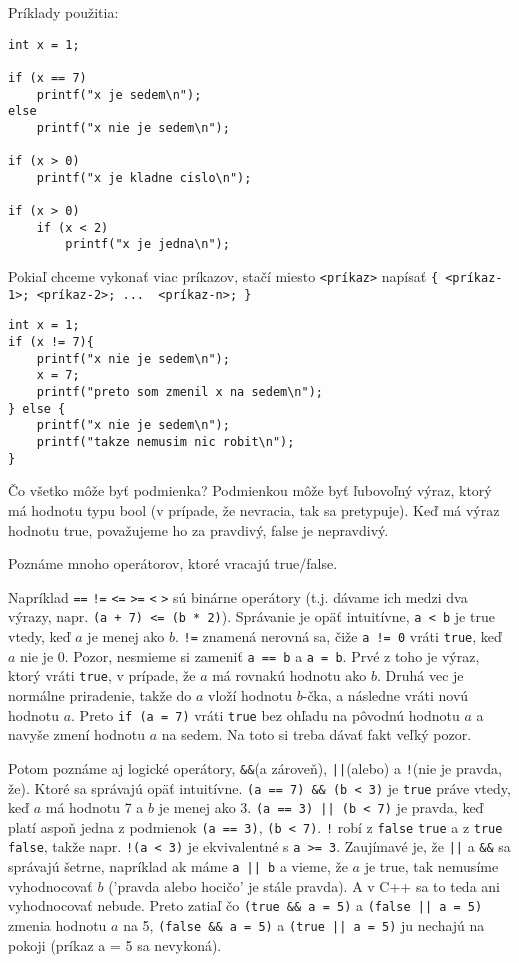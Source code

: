 Príklady použitia:
\begin{lstlisting}
int x = 1;

if (x == 7) 
    printf("x je sedem\n");
else
    printf("x nie je sedem\n");

if (x > 0)
    printf("x je kladne cislo\n");

if (x > 0)
    if (x < 2)
        printf("x je jedna\n");
\end{lstlisting}

Pokiaľ chceme vykonať viac príkazov, stačí miesto \verb!<príkaz>! napísať \verb!{ <príkaz-1>; <príkaz-2>; ...  <príkaz-n>; }!
\begin{lstlisting}
int x = 1;
if (x != 7){
    printf("x nie je sedem\n");
    x = 7;
    printf("preto som zmenil x na sedem\n");
} else {
    printf("x nie je sedem\n");
    printf("takze nemusim nic robit\n");
}
\end{lstlisting}

\medskip

Čo všetko môže byť podmienka?  Podmienkou môže byť ľubovoľný výraz, ktorý má
hodnotu typu bool (v prípade, že nevracia, tak sa pretypuje).  Keď má výraz
hodnotu true, považujeme ho za pravdivý, false je nepravdivý.

Poznáme mnoho operátorov, ktoré vracajú true/false. 

Napríklad \verb'==' \verb'!=' \verb'<=' \verb'>=' \verb'<' \verb'>' sú binárne
operátory (t.j. dávame ich medzi dva výrazy, napr. \verb!(a + 7) <= (b * 2)!).
Správanie je opäť intuitívne, \verb'a < b' je true vtedy, keď $a$ je menej ako
$b$.  \verb'!=' znamená nerovná sa, čiže \verb'a != 0' vráti \verb!true!, keď
$a$ nie je 0. Pozor, nesmieme si zameniť \verb'a == b' a \verb'a = b'.  Prvé z
toho je výraz, ktorý vráti \verb!true!, v prípade, že $a$ má rovnakú hodnotu
ako $b$. Druhá vec je normálne priradenie, takže do $a$ vloží hodnotu $b$-čka,
a následne vráti novú hodnotu $a$. Preto \verb!if (a = 7)! vráti \verb!true!
bez ohľadu na pôvodnú hodnotu $a$ a navyše zmení hodnotu $a$ na sedem.  Na toto
si treba dávať fakt veľký pozor. 

Potom poznáme aj logické operátory, \verb!&&!(a zároveň), \verb!||!(alebo) a
\verb'!'(nie je pravda, že). Ktoré sa správajú opäť intuitívne.  
\verb!(a == 7) && (b < 3)! je \verb!true! práve vtedy, keď $a$ má hodnotu 7 a
$b$ je menej ako 3. \verb!(a == 3) || (b < 7)! je pravda, keď platí aspoň jedna
z podmienok \verb!(a == 3)!, \verb!(b < 7)!. \verb'!' robí z 
\verb!false! \verb!true! a z \verb!true! \verb!false!, takže napr. \verb'!(a < 3)' je
ekvivalentné s \verb'a >= 3'.  Zaujímavé je, že \verb!||! a \verb!&&! sa
správajú šetrne, napríklad ak máme \verb!a || b! a vieme, že $a$ je true, tak
nemusíme vyhodnocovať $b$ ('pravda alebo hocičo' je stále pravda). A v C++ sa
to teda ani vyhodnocovať nebude.  Preto zatiaľ čo \verb!(true && a = 5)! a
\verb!(false || a = 5)!  zmenia hodnotu $a$ na 5, \verb!(false && a = 5)! a
\verb!(true || a = 5)! ju nechajú na pokoji (príkaz a = 5 sa nevykoná).

